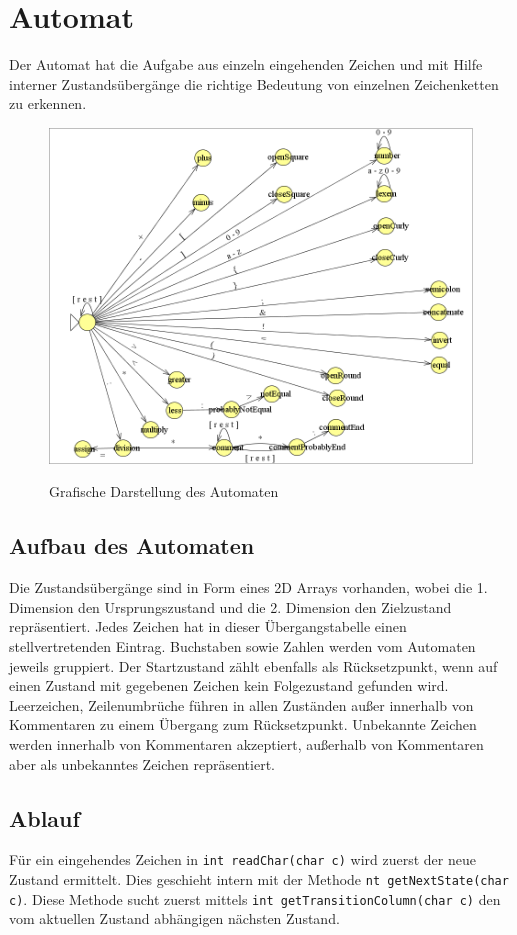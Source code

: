 \documentclass[listof=totoc,DIV11,a4paper]{scrreprt}
\begin{document}
\section{Automat}\label{sec:automat}
Der Automat hat die Aufgabe aus einzeln eingehenden Zeichen und mit Hilfe interner Zustandsübergänge die richtige Bedeutung von einzelnen Zeichenketten zu erkennen.

\begin{figure}[h]
\includegraphics[width=\textwidth]{images/automat}
\label{img:automat}
\caption{Grafische Darstellung des Automaten}
\end{figure}

\subsection{Aufbau des Automaten}
Die Zustandsübergänge sind in Form eines 2D Arrays vorhanden, wobei die 1. Dimension den Ursprungszustand und die 2. Dimension den Zielzustand repräsentiert.
Jedes Zeichen hat in dieser Übergangstabelle einen stellvertretenden Eintrag. Buchstaben sowie Zahlen werden vom Automaten jeweils gruppiert.
Der Startzustand zählt ebenfalls als Rücksetzpunkt, wenn auf einen Zustand mit gegebenen Zeichen kein Folgezustand gefunden wird.
Leerzeichen, Zeilenumbrüche führen in allen Zuständen außer innerhalb von Kommentaren zu einem Übergang zum Rücksetzpunkt.
Unbekannte Zeichen werden innerhalb von Kommentaren akzeptiert, außerhalb von Kommentaren aber als unbekanntes Zeichen repräsentiert.

\subsection{Ablauf}
Für ein eingehendes Zeichen in \verb+int readChar(char c)+ wird zuerst der neue Zustand ermittelt. Dies geschieht intern mit der Methode \verb+nt getNextState(char c)+.
Diese Methode sucht zuerst mittels \verb+int getTransitionColumn(char c)+ den vom aktuellen Zustand abhängigen nächsten Zustand.
\end{document}
